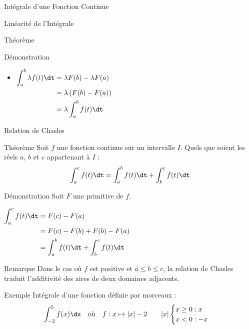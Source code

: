 \documentclass{cours}
\begin{document}
\begin{Gpartie}{Intégrale d'une Fonction Continue}
\begin{Spartie}{Linéarité de l'Intégrale}
\begin{SSpartie}{Théorème}
\begin{SSSpartie}{Démonstration}
\begin{itemize}
                        $\begin{aligned}[t]
                            \int_a^b\left(f+g\right)(t)\dt&=\left(F+G\right)(t)-\left(F+G\right)(t) \\
                            &=F(b)+G(b)-F(a)-G(a) \\
                            &=F(b)-F(a)+G(b)-G(a) \\
                            &=\int_a^b f(t)\dt+\int_a^b g(t)\dt
                        \end{aligned}$

                        \item $\begin{aligned}[t]
                            \int_a^b\lambda f(t)\dt&=\lambda F(b)-\lambda F(a) \\
                            &=\lambda\left(F(b)-F(a)\right) \\
                            &=\lambda\int_a^b f(t)\dt
                        \end{aligned}$
                    \end{itemize}
                \end{SSSpartie}
            \end{SSpartie}
        \end{Spartie}
        \pagebreak
        \begin{Spartie}{Relation de Chasles} 
            \begin{SSpartie}{Théorème} 
                Soit $f$ une fonction continue sur un intervalle $I$. Quels que soient les réels $a$, $b$ et $c$ appartenant à $I$ : \[\int_a^c f(t)\dt=\int_a^b f(t)\dt+\int_b^cf(t)\dt\]
                \begin{SSSpartie}{Démonstration} 
                    Soit $F$ une primitive de $f$.

                    $\begin{aligned}[t]
                        \int_a^c f(t)\dt&=F(c)-F(a) \\
                        &=F(c)-F(b)+F(b)-F(a) \\
                        &=\int_a^b f(t)\dt+\int_b^c f(t)\dt
                    \end{aligned}$
                \end{SSSpartie}
            \end{SSpartie}
            \begin{SSpartie}{Remarque} 
                Dans le cas où $f$ est positive et $a\leq b\leq c$, la relation de Chasles traduit l'additivité des aires de deux domaines adjacents.
            \end{SSpartie}
            \begin{SSpartie}{Exemple} 
                Intégrale d'une fonction définie par morceaux : \[\int_{-2}^5f(x)\dx\quad\text{où}\quad f:x\mapsto\lvert x\rvert-2\qquad\lvert x\rvert\begin{cases}x\geq0:x\\x<0:-x\end{cases}\]


\end{SSpartie}
\end{Spartie}
\end{Gpartie}
\end{document}
